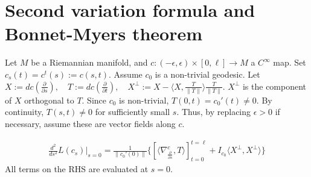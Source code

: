 \section{Second variation formula and Bonnet-Myers theorem}
Let $M$ be a Riemannian manifold, and $c:(-\epsilon, \epsilon)\times [0,\ell] \to M$ a $C^{\infty}$ map.
Set $c_s(t)=c^t(s):=c(s,t)$. Assume $c_0$ is a non-trivial geodesic.
Let $X:=dc(\frac{\partial}{\partial s}), \quad T:= dc(\frac{\partial}{\partial t}), \quad X^{\perp}:= X- \langle X, \frac{T}{\|T\|}\rangle \frac{T}{\|T\|}$.
$X^{\perp}$ is the component of $X$ orthogonal to $T$. Since $c_0$ is non-trivial, $T(0,t) = c_0'(t) \neq 0$.
By continuity, $T(s,t) \neq 0$ for sufficiently small $s$. Thus, by replacing $\epsilon >0$ if necessary, assume these are vector fields along $c$.

\begin{theorem}
    \[
    \begin{aligned}
        \frac{d^2}{ds^2} L(c_s)|_{s=0} = \frac{1}{\|c_0'(0)\|}\{[\langle \nabla^c_{\frac{\partial}{\partial s}}, T \rangle]_{t=0}^{t=\ell}+I_{c_0}\langle X^{\perp}, X^{\perp}\rangle \}
    \end{aligned}
    \]
    All terms on the RHS are evaluated at $s=0$.
    \label{thm:13.1}
\end{theorem}
